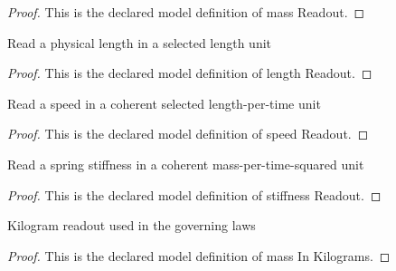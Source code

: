 \begin{proof}
  This is the declared model definition of mass Readout.
\end{proof}
\begin{definition}
  \label{def:physics:phyx-mini-0260:phyxminiproblems-problemphyxmini0260-lengthreadout}
  Read a physical length in a selected length unit
\end{definition}
\begin{proof}
  This is the declared model definition of length Readout.
\end{proof}
\begin{definition}
  \label{def:physics:phyx-mini-0260:phyxminiproblems-problemphyxmini0260-speedreadout}
  Read a speed in a coherent selected length-per-time unit
\end{definition}
\begin{proof}
  This is the declared model definition of speed Readout.
\end{proof}
\begin{definition}
  \label{def:physics:phyx-mini-0260:phyxminiproblems-problemphyxmini0260-stiffnessreadout}
  Read a spring stiffness in a coherent mass-per-time-squared unit
\end{definition}
\begin{proof}
  This is the declared model definition of stiffness Readout.
\end{proof}
\begin{definition}
  \label{def:physics:phyx-mini-0260:phyxminiproblems-problemphyxmini0260-massinkilograms}
  Kilogram readout used in the governing laws
\end{definition}
\begin{proof}
  This is the declared model definition of mass In Kilograms.
\end{proof}
